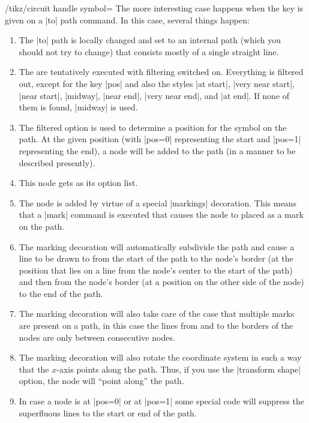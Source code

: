 \begin{key}{/tikz/circuit handle symbol=}
  The more interesting case happens when the key is given on a |to|
  path command. In this case, several things happen:
  \begin{enumerate}
  \item The |to| path is locally changed and set to an internal 
    path (which you should not try to change) that consists mostly of
    a single straight line.
  \item The  are tentatively executed with filtering
    switched on. Everything is filtered out, except for the key |pos|
    and also the styles |at start|, |very near start|, |near start|,
    |midway|, |near end|, |very near end|, and |at end|. If none of
    them is found, |midway| is used.
  \item The filtered option is used to determine a position for the
    symbol on the path. At the given position (with |pos=0|
    representing the start and |pos=1| representing the end), a node
    will be added to the path (in a manner to be described presently).
  \item This node gets  as its option list.
  \item The node is added by virtue of a special |markings|
    decoration. This means that a |mark| command is executed that
    causes the node to placed as a mark on the path.
  \item The marking decoration will automatically subdivide the path
    and cause a line to be drawn to from the start of the path to the
    node's border (at the position that lies on a line from the node's
    center to the start of the path) and then from the node's border
    (at a position on the other side of the node) to the end of the
    path.
  \item The marking decoration will also take care of the case that
    multiple marks are present on a path, in this case the lines from
    and to the borders of the nodes are only between consecutive
    nodes.
  \item The marking decoration will also rotate the coordinate system
    in such a way that the $x$-axis points along the path. Thus, if
    you use the |transform shape| option, the node will ``point
    along'' the path.
  \item In case a node is at |pos=0| or at |pos=1| some special code
    will suppress the superfluous lines to the start or end of the
    path. 
  \end{enumerate}


\end{key}
